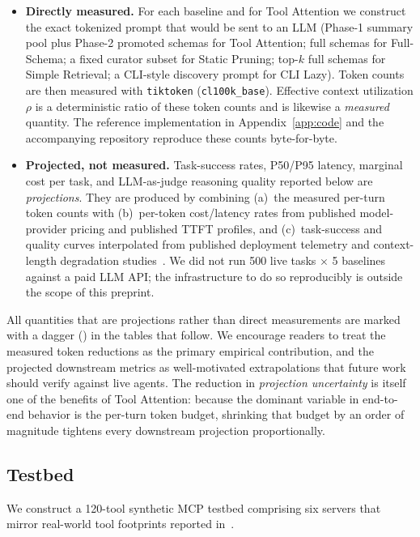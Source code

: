 \documentclass[11pt]{article}
\begin{document}
\begin{itemize}
\item \textbf{Directly measured.} For each baseline and for Tool Attention we construct the exact tokenized prompt that would be sent to an LLM (Phase-1 summary pool plus Phase-2 promoted schemas for Tool Attention; full schemas for Full-Schema; a fixed curator subset for Static Pruning; top-$k$ full schemas for Simple Retrieval; a CLI-style discovery prompt for CLI Lazy). Token counts are then measured with \texttt{tiktoken} (\texttt{cl100k\_base}). Effective context utilization $\rho$ is a deterministic ratio of these token counts and is likewise a \emph{measured} quantity. The reference implementation in Appendix~\ref{app:code} and the accompanying repository reproduce these counts byte-for-byte.
\item \textbf{Projected, not measured.} Task-success rates, P50/P95 latency, marginal cost per task, and LLM-as-judge reasoning quality reported below are \emph{projections}. They are produced by combining (a)~the measured per-turn token counts with (b)~per-token cost/latency rates from published model-provider pricing and published TTFT profiles, and (c)~task-success and quality curves interpolated from published deployment telemetry and context-length degradation studies~\citep{pan2026agent,modarressi2025nolima,kloski2026mcp,mindstudio2026claudecode}. We did not run 500 live tasks $\times$ 5 baselines against a paid LLM API; the infrastructure to do so reproducibly is outside the scope of this preprint.
\end{itemize}

All quantities that are projections rather than direct measurements are marked with a dagger (\dag) in the tables that follow. We encourage readers to treat the measured token reductions as the primary empirical contribution, and the projected downstream metrics as well-motivated extrapolations that future work should verify against live agents. The reduction in \emph{projection uncertainty} is itself one of the benefits of Tool Attention: because the dominant variable in end-to-end behavior is the per-turn token budget, shrinking that budget by an order of magnitude tightens every downstream projection proportionally.

\subsection{Testbed}

We construct a 120-tool synthetic MCP testbed comprising six servers that mirror real-world tool footprints reported in~\citep{kloski2026mcp,mindstudio2026claudecode}.
\end{document}
